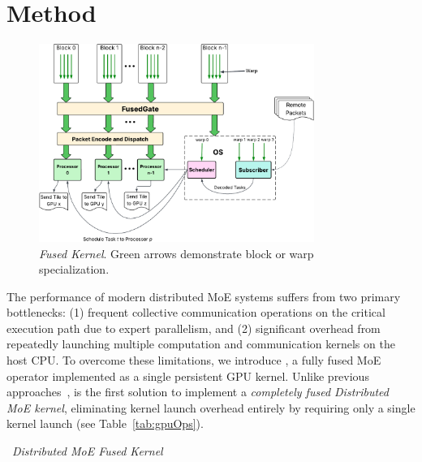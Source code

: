 \chapter{Method}\label{ch:method}
\begin{figure}[!ht]
    \centering
    \includegraphics[width=0.8\textwidth, keepaspectratio]{figures/architecture}
    \caption{\emph{\sysname Fused Kernel}. Green arrows demonstrate block or warp specialization.}
    \label{fig:fusedK}
\end{figure}
The performance of modern distributed MoE systems suffers from two primary bottlenecks:
(1) frequent \alltoall collective communication operations on the critical execution path due to expert parallelism,
and (2) significant overhead from repeatedly launching multiple computation and communication kernels on the host CPU.
To overcome these limitations, we introduce \sysname, a fully fused MoE operator implemented as a single persistent GPU kernel.
Unlike previous approaches~\cite{comet, deepep, pmlr-v162-rajbhandari22a, megatron, MLSYS2023_5616d34c,
    MLSYS2024_339caf45, 10.1145/3503221.3508418, 10.1145/3588964, 10.1145/3627703.3650083,
    10.1145/3710848.3710868, NEURIPS2022_67d57c32}, \sysname is the first solution to implement a
\emph{completely fused Distributed MoE kernel}, eliminating kernel launch overhead entirely by
requiring only a single kernel launch (see Table~\ref{tab:gpuOps}).

\begin{algorithm}[!h]
    \DontPrintSemicolon
    \caption{~\emph{\sysname Distributed MoE Fused Kernel}}\label{alg:one}
\end{algorithm}
